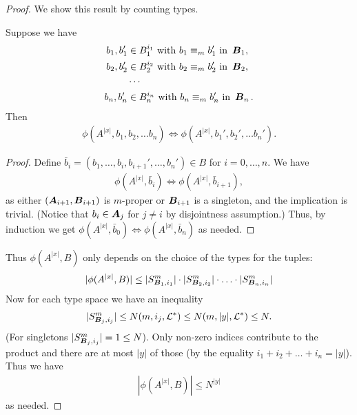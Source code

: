 \begin{proof}
  We show this result by counting types.
  \begin{Claim}
    Suppose we have
    \begin{align*}
      b_1, b_1' &\in B_1^{i_1} \text{ with } b_1 \equiv_m b_1' \text { in } \operatorname{\boldsymbol B}_1, \\
      b_2, b_2' &\in B_2^{i_2} \text{ with } b_2 \equiv_m b_2' \text { in } \operatorname{\boldsymbol B}_2, \\
                &\cdots \\
      b_n, b_n' &\in B_n^{i_n} \text{ with } b_n \equiv_m b_n' \text { in } \operatorname{\boldsymbol B}_n.
    \end{align*}
    Then
    \begin{align*}
      \phi(A^{|x|}, b_1, b_2, \ldots b_n) \iff \phi(A^{|x|}, b_1', b_2', \ldots b_n').
    \end{align*}
  \end{Claim}
  \begin{proof}
    Define $\bar b_i = (b_1, \ldots, b_i, b_{i+1}', \ldots, b_n') \in B$ for $i = 0, \ldots, n$.
    We have
    \begin{align*}      
      \phi(A^{|x|}, \bar b_i) \iff \phi(A^{|x|}, \bar b_{i+1}),
    \end{align*}
    as either $(\operatorname{\boldsymbol A}_{i+1}, \operatorname{\boldsymbol B}_{i+1})$ is $m$-proper
    or $\operatorname{\boldsymbol B}_{i+1}$ is a singleton, and the implication is trivial.
    (Notice that $b_i \in \operatorname{\boldsymbol A}_j$ for $j \neq i$ by disjointness assumption.)
    Thus, by induction we get $\phi(A^{|x|}, \bar b_0) \iff \phi(A^{|x|}, \bar b_n)$ as needed.
  \end{proof}
  Thus $\phi(A^{|x|}, B)$ only depends on the choice of the types for the tuples:
  \begin{align*}
    |\phi(A^{|x|}, B)| \leq |S^m_{\operatorname{\boldsymbol B}_1, i_1}| \cdot |S^m_{\operatorname{\boldsymbol B}_2, i_2}| \cdot \ldots \cdot |S^m_{\operatorname{\boldsymbol B}_n, i_n}|
  \end{align*}
  Now for each type space we have an inequality
  \begin{align*}
    |S^m_{\operatorname{\boldsymbol B}_j, i_j}| \leq N(m, i_j, \mathcal L^*) \leq N(m, |y|, \mathcal L^*) \leq N.
  \end{align*}
  (For singletons $|S^m_{\operatorname{\boldsymbol B}_j, i_j}| = 1 \leq N$). Only non-zero indices contribute to the product and there are at most $|y|$ of those (by the equality $i_1 + i_2 + \ldots + i_n = |y|$). Thus we have
  \begin{align*}
    |\phi(A^{|x|}, B)| \leq N^{|y|}
  \end{align*}
  as needed.
\end{proof}

